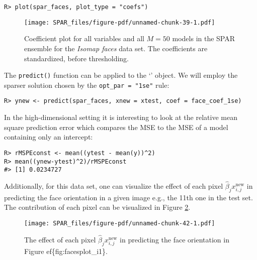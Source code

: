 \documentclass[
  article]{jss}
\newcommand{\class}[1]{`\code{#1}'}
\begin{document}
\begin{verbatim}
R> plot(spar_faces, plot_type = "coefs")
\end{verbatim}

\begin{figure}[H]

{\centering \texttt{[image: SPAR\_files/figure-pdf/unnamed-chunk-39-1.pdf]}

}

\caption{Coefficient plot for all variables and all \(M=50\) models in
the SPAR ensemble for the \emph{Isomap faces} data set. The coefficients
are standardized, before thresholding. \label{fig:faces_coefs}}

\end{figure}%

The \texttt{predict()} function can be applied to the \class{spar.cv}
object. We will employ the sparser solution chosen by the
\texttt{opt\_par\ =\ "1se"} rule:

\begin{verbatim}
R> ynew <- predict(spar_faces, xnew = xtest, coef = face_coef_1se)
\end{verbatim}

In the high-dimensional setting it is interesting to look at the
relative mean square prediction error which compares the MSE to the MSE
of a model containing only an intercept:

\begin{verbatim}
R> rMSPEconst <- mean((ytest - mean(y))^2) 
R> mean((ynew-ytest)^2)/rMSPEconst
#> [1] 0.0234727
\end{verbatim}

Additionally, for this data set, one can visualize the effect of each
pixel \(\hat\beta_j x^\text{new}_{i,j}\) in predicting the face
orientation in a given image e.g., the 11th one in the test set. The
contribution of each pixel can be visualized in Figure
\ref{fig:faces_predictions}.

\begin{figure}[H]

{\centering \texttt{[image: SPAR\_files/figure-pdf/unnamed-chunk-42-1.pdf]}

}

\caption{The effect of each pixel \(\hat\beta_j x^\text{new}_{i,j}\) in
predicting the face orientation in Figure ef\{fig:facesplot\_i1\}.
\label{fig:faces_predictions}}

\end{figure}%
\end{document}

